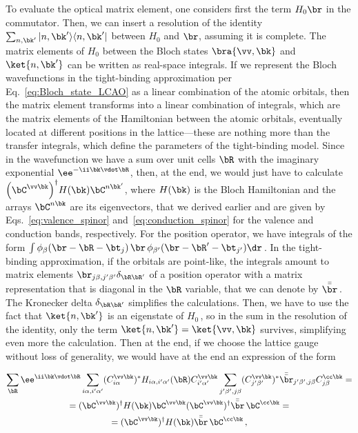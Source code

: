 To evaluate the optical matrix element, one considers first  the term $H_0 \br$ in the commutator.
Then, we can insert a resolution of the identity $\sum_{n,\bk'} |n,\bk'\rangle \langle n,\bk'|$ between $H_0$ and $\br$, assuming it is complete.
The matrix elements of $H_0$ between the Bloch states $\bra{\vv ,\bk}$ and $\ket{n,\bk'}$ can be written as real-space integrals.
If we represent the Bloch wavefunctions in the tight-binding approximation per Eq.~\eqref{eq:Bloch_state_LCAO} as a linear combination of the atomic orbitals, then the matrix element transforms into a linear combination of integrals, which are the matrix elements of the Hamiltonian between the atomic orbitals, eventually located at different positions in the lattice---these are nothing more than the transfer integrals, which define the parameters of the tight-binding model.
Since in the wavefunction we have a sum over unit cells $\bR$ with the imaginary exponential $\ee^{-\ii \bk \vdot \bR}$, then, at the end, we would just have to calculate $\left(\bC^{\vv \bk}\right)^{\dagger}\! H(\bk) \bC^{n \bk'}$, where $H(\bk)$ is the Bloch Hamiltonian and the arrays $\bC^{n \bk}$ are its eigenvectors, that we derived earlier and are given by Eqs.~\eqref{eq:valence_spinor} and~\eqref{eq:conduction_spinor} for the valence and conduction bands, respectively.
For the position operator, we have integrals of the form $\int \phi_{\beta}(\br - \bR -\bt_j)\, \br\, \phi_{\beta'}(\br - \bR' -\bt_{j'}) \dr$\,.
In the tight-binding approximation, if the orbitals are point-like, the integrals amount to matrix elements $\br_{j \beta,j' \beta'} \delta_{\bR \bR'}$ of a position operator with a matrix representation that is diagonal in the $\bR$ variable, that we can denote by $\bar{\bar{\br}}$\,.
The Kronecker delta $\delta_{\bR \bR'}$ simplifies the calculations.
Then, we have to use the fact that $\ket{n,\bk'}$ is an eigenstate of $H_0$\,, so in the sum in the resolution of the identity, only the term $\ket{n,\bk'} = \ket{\vv ,\bk}$ survives, simplifying even more the calculation.
Then at the end, if we choose the lattice gauge without loss of generality, we would have at the end an expression of the form

\begin{equation*}
\begin{gathered}
    \sum_{\bR} \ee^{\ii \bk \vdot \bR} \sum_{i\alpha,i'\alpha'} (C^{\vv \bk}_{i\alpha})^* H_{i\alpha,i'\alpha'}(\bR) C^{\vv \bk}_{i'\alpha'} \sum_{j'\beta',j\beta} (C^{\vv \bk}_{j'\beta'})^* \bar{\bar{\br}}_{j'\beta',j\beta} C^{\cc \bk}_{j\beta} = \\
    = (\bC^{\vv \bk})^\dagger H(\bk) \bC^{\vv \bk} (\bC^{\vv \bk})^{\dagger} \bar{\bar{\br}}\, \bC^{\cc \bk} = \\
    = (\bC^{\vv \bk})^\dagger H(\bk) \bar{\bar{\br}}\, \bC^{\cc \bk} \,,
\end{gathered}
\end{equation*}



